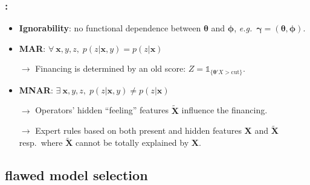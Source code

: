 \documentclass[english,xcolor={rgb,dvipsnames,table,usenames}]{beamer}
\begin{document}
\begin{frame}
\frametitle{\secname : \subsecname}

\begin{itemize}
\item \textbf{Ignorability}: no functional dependence between $\bm{\theta}$ and $\bm{\phi}$, \textit{e.g.}\ $\bm{\gamma} = (\bm{\theta},\bm{\phi})$.

\item<2-> \textbf{MAR}: $\forall \: \bm{x},y,z, \; p(z| \bm{x},y) = p(z| \bm{x})$

$\rightarrow$ Financing is determined by an old score: $Z = \mathds{1}_{\{\bm{\theta}'X > \text{cut}\}}$.

\item<3-> \textbf{MNAR}: $\exists \: \bm{x},y,z, \; p(z| \bm{x},y) \neq p(z| \bm{x})$

$\rightarrow$ Operators' hidden ``feeling'' features $\tilde{\bm{X}}$ influence the financing.

$\rightarrow$ Expert rules based on both present and hidden features $\bm{X}$ and $\tilde{\bm{X}}$ resp.\ where $\tilde{\bm{X}}$ cannot be totally explained by $\bm{X}$.
\end{itemize}

\end{frame}



\subsection{flawed model selection}
\end{document}
